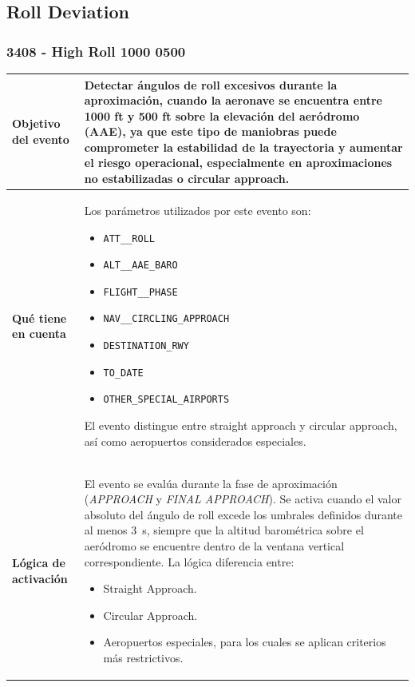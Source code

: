 \documentclass[11pt,a4paper]{article}
\begin{document}
	\subsection{Roll Deviation}
	
	\subsubsection{3408 - High Roll 1000 0500}
	\begin{longtable}{p{5cm} p{9.5cm}}
		\hline
		\textbf{Objetivo del evento} &
		Detectar ángulos de roll excesivos durante la aproximación, cuando la aeronave se encuentra entre 1000 ft y 500 ft sobre la elevación del aeródromo (AAE), ya que este tipo de maniobras puede comprometer la estabilidad de la trayectoria y aumentar el riesgo operacional, especialmente en aproximaciones no estabilizadas o circular approach. \\
		\hline
		\textbf{Qué tiene en cuenta} &
		Los parámetros utilizados por este evento son:
		\begin{itemize}
			\item \texttt{ATT\_\_ROLL}
			\item \texttt{ALT\_\_AAE\_BARO}
			\item \texttt{FLIGHT\_\_PHASE}
			\item \texttt{NAV\_\_CIRCLING\_APPROACH}
			\item \texttt{DESTINATION\_RWY}
			\item \texttt{TO\_DATE}
			\item \texttt{OTHER\_SPECIAL\_AIRPORTS}
		\end{itemize}
		El evento distingue entre straight approach y circular approach, así como aeropuertos considerados especiales. \\
		\hline
		\textbf{Lógica de activación} &
		El evento se evalúa durante la fase de aproximación (\textit{APPROACH} y \textit{FINAL APPROACH}).  
		Se activa cuando el valor absoluto del ángulo de roll excede los umbrales definidos durante al menos \SI{3}{s}, siempre que la altitud barométrica sobre el aeródromo se encuentre dentro de la ventana vertical correspondiente.  
		La lógica diferencia entre:
		\begin{itemize}
			\item Straight Approach.
			\item Circular Approach.
			\item Aeropuertos especiales, para los cuales se aplican criterios más restrictivos.
		\end{itemize}

\end{longtable}
\end{document}
